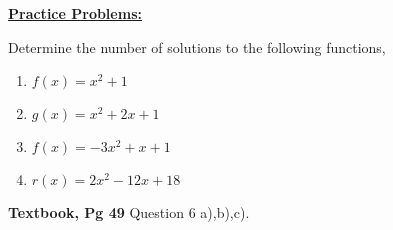 \documentclass[12pt]{article} %
\begin{document}
\textbf{\underline{\Large{Practice Problems:}}}
\begin{qstn}
  Determine the number of solutions to the following functions,
  \begin{enumerate}[label=(\alph*)]
    \item $f(x) = x^2 + 1$
    \item $g(x) = x^2 + 2x + 1$
    \item $f(x) = -3x^2 + x + 1$
    \item $r(x) = 2x^2 - 12x + 18$
  \end{enumerate}
\end{qstn}

\begin{qstn}
  \textbf{Textbook, Pg 49} Question 6 a),b),c).
\end{qstn}
\end{document}
